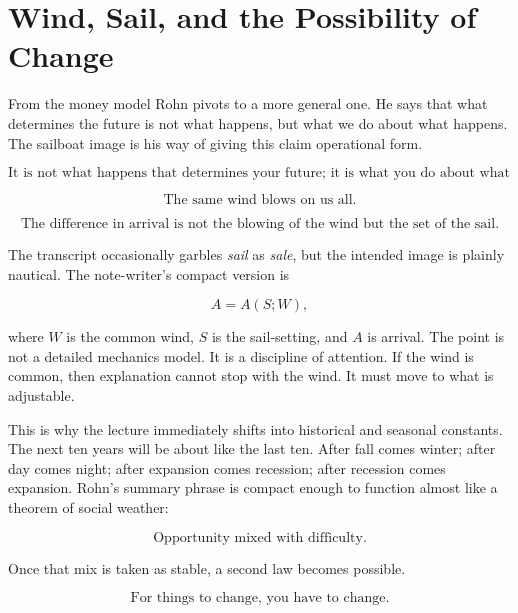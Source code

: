 \section{Wind, Sail, and the Possibility of Change}

From the money model Rohn pivots to a more general one. He says that what determines the future is not what happens, but what we do about what happens. The sailboat image is his way of giving this claim operational form.

\begin{equation}
\text{It is not what happens that determines your future; it is what you do about what happens.}
\end{equation}

\begin{equation}
\text{The same wind blows on us all.}
\end{equation}

\begin{equation}
\text{The difference in arrival is not the blowing of the wind but the set of the sail.}
\end{equation}

The transcript occasionally garbles \emph{sail} as \emph{sale}, but the intended image is plainly nautical. The note-writer's compact version is

\begin{equation}
A = A(S;W),
\end{equation}

where \(W\) is the common wind, \(S\) is the sail-setting, and \(A\) is arrival. The point is not a detailed mechanics model. It is a discipline of attention. If the wind is common, then explanation cannot stop with the wind. It must move to what is adjustable.

This is why the lecture immediately shifts into historical and seasonal constants. The next ten years will be about like the last ten. After fall comes winter; after day comes night; after expansion comes recession; after recession comes expansion. Rohn's summary phrase is compact enough to function almost like a theorem of social weather:

\begin{equation}
\text{Opportunity mixed with difficulty.}
\end{equation}

Once that mix is taken as stable, a second law becomes possible.

\begin{equation}
\text{For things to change, you have to change.}
\end{equation}

